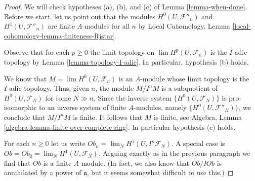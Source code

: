 \documentclass{stacks-project}
\theoremstyle{plain}
\theoremstyle{definition}
\theoremstyle{remark}
\numberwithin{equation}{subsection}
\def\lim{\mathop{\mathrm{lim}}\nolimits}
\begin{document}
\begin{proof}
We will check hypotheses (a), (b), and (c) of Lemma \ref{lemma-when-done}.
Before we start, let us point out that the modules
$H^0(U, \mathcal{F}''_n)$ and $H^1(U, \mathcal{F}''_n)$
are finite $A$-modules for all $n$ by
Local Cohomology, Lemma \ref{local-cohomology-lemma-finiteness-Rjstar}.

\medskip\noindent
Observe that for each $p \geq 0$
the limit topology on $\lim H^p(U, \mathcal{F}_n)$
is the $I$-adic topology by Lemma \ref{lemma-topology-I-adic}.
In particular, hypothesis (b) holds.

\medskip\noindent
We know that $M = \lim H^0(U, \mathcal{F}_n)$ is an $A$-module whose
limit topology is the $I$-adic topology. Thus, given $n$, the module
$M/I^nM$ is a subquotient of $H^0(U, \mathcal{F}_N)$ for some $N \gg n$.
Since the inverse system $\{H^0(U, \mathcal{F}_N)\}$ is pro-isomorphic to an
inverse system of finite $A$-modules, namely $\{H^0(U, \mathcal{F}''_N)\}$,
we conclude that $M/I^nM$ is finite. It follows that $M$ is finite, see
Algebra, Lemma \ref{algebra-lemma-finite-over-complete-ring}.
In particular hypothesis (c) holds.

\medskip\noindent
For each $n \geq 0$ let us write $Ob_n = \lim_N H^1(U, I^n\mathcal{F}_N)$.
A special case is $Ob = Ob_0 = \lim_N H^1(U, \mathcal{F}_N)$.
Arguing exactly as in the previous paragraph we find that $Ob$
is a finite $A$-module. (In fact, we also know that $Ob/I Ob$ is annihilated
by a power of $\mathfrak a$, but it seems somewhat difficult to use this.)


\end{proof}
\end{document}
